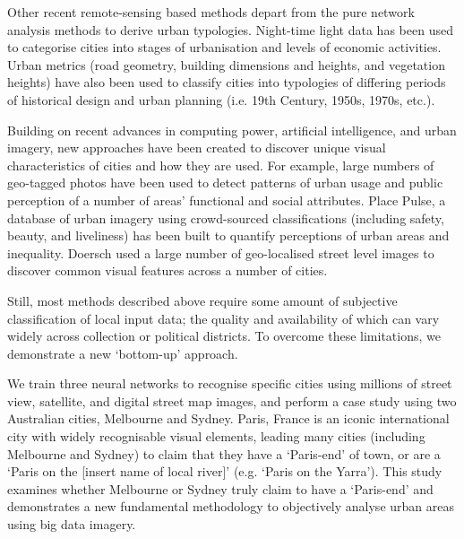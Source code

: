 \documentclass{nature}
\begin{document}
Other recent remote-sensing based methods depart from the pure network analysis methods to derive urban typologies. Night-time light data has been used to categorise cities into stages of urbanisation and levels of economic activities\cite{Zhang2013}. Urban metrics (road geometry, building dimensions and heights, and vegetation heights) have also been used to classify cities into typologies of differing periods of historical design and urban planning (i.e. 19th Century, 1950s, 1970s, etc.)\cite{Hermosilla2014}.

Building on recent advances in computing power, artificial intelligence, and urban imagery, new approaches have been created to discover unique visual characteristics of cities and how they are used. For example, large numbers of geo-tagged photos have been used to detect patterns of urban usage and public perception of a number of areas' functional and social attributes\cite{Liu2016,Zhou2014a}. Place Pulse, a database of urban imagery using crowd-sourced classifications (including safety, beauty, and liveliness) has been built to quantify perceptions of urban areas\cite{Dubey2016,Naik2014} and inequality\cite{Salesses2013}. Doersch\cite{Doersch2012} used a large number of geo-localised street level images to discover common visual features across a number of cities.


Still, most methods described above require some amount of subjective classification of local input data; the quality and availability of which can vary widely across collection or political districts. To overcome these limitations, we demonstrate a new `bottom-up' approach. 


We train three neural networks to recognise specific cities using millions of street view, satellite, and digital street map images, and perform a case study using two Australian cities, Melbourne and Sydney. Paris, France is an iconic international city\cite{Anholt2006} with widely recognisable visual elements\cite{Doersch2012}, leading many cities (including Melbourne and Sydney) to claim that they have a `Paris-end' of town\cite{Williams2010}, or are a `Paris on the [insert name of local river]'\cite{Wilden2013} (e.g. `Paris on the Yarra'). This study examines whether Melbourne or Sydney truly claim to have a `Paris-end' and demonstrates a new fundamental methodology to objectively analyse urban areas using big data imagery.
\end{document}
